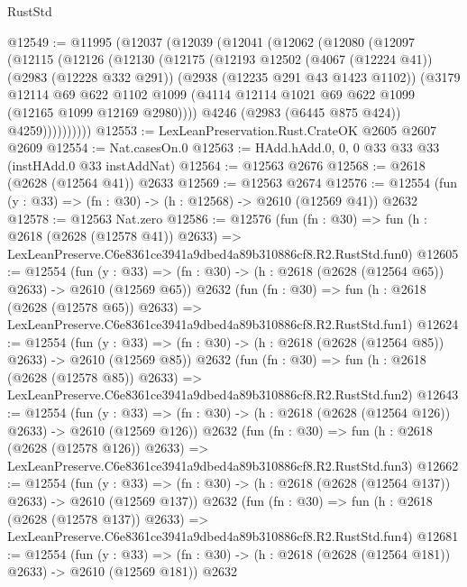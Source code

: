 \begin{lexlean}{RustStd}
\begin{coremodule}
@12549 := @11995
    (@12037
      (@12039
        (@12041
          (@12062
            (@12080
              (@12097
                (@12115
                  (@12126
                    (@12130
                      (@12175
                        (@12193
                          @12502
                          (@4067 (@12224 @41))
                          (@2983 (@12228 @332 @291))
                          (@2938 (@12235 @291 @43 @1423 @1102))
                          (@3179
                            @12114
                            @69
                            @622
                            @1102
                            @1099
                            (@4114 @12114 @1021 @69 @622 @1099 (@12165 @1099 @12169 @2980))))
                        @4246
                        (@2983 (@6445 @875 @424))
                        @4259))))))))))
@12553 := LexLeanPreservation.Rust.CrateOK @2605 @2607 @2609
@12554 := Nat.casesOn.{0}
@12563 := HAdd.hAdd.{0, 0, 0} @33 @33 @33 (instHAdd.{0} @33 instAddNat)
@12564 := @12563 @2676
@12568 := @2618 (@2628 (@12564 @41)) @2633
@12569 := @12563 @2674
@12576 := @12554 (fun (y : @33) => (fn : @30) -> (h : @12568) -> @2610 (@12569 @41)) @2632
@12578 := @12563 Nat.zero
@12586 := @12576
    (fun (fn : @30) =>
    fun (h : @2618 (@2628 (@12578 @41)) @2633) =>
    LexLeanPreserve.C6e8361ce3941a9dbed4a89b310886cf8.R2.RustStd.fun0)
@12605 := @12554
    (fun (y : @33) => (fn : @30) -> (h : @2618 (@2628 (@12564 @65)) @2633) -> @2610 (@12569 @65))
    @2632
    (fun (fn : @30) =>
    fun (h : @2618 (@2628 (@12578 @65)) @2633) =>
    LexLeanPreserve.C6e8361ce3941a9dbed4a89b310886cf8.R2.RustStd.fun1)
@12624 := @12554
    (fun (y : @33) => (fn : @30) -> (h : @2618 (@2628 (@12564 @85)) @2633) -> @2610 (@12569 @85))
    @2632
    (fun (fn : @30) =>
    fun (h : @2618 (@2628 (@12578 @85)) @2633) =>
    LexLeanPreserve.C6e8361ce3941a9dbed4a89b310886cf8.R2.RustStd.fun2)
@12643 := @12554
    (fun (y : @33) => (fn : @30) -> (h : @2618 (@2628 (@12564 @126)) @2633) -> @2610 (@12569 @126))
    @2632
    (fun (fn : @30) =>
    fun (h : @2618 (@2628 (@12578 @126)) @2633) =>
    LexLeanPreserve.C6e8361ce3941a9dbed4a89b310886cf8.R2.RustStd.fun3)
@12662 := @12554
    (fun (y : @33) => (fn : @30) -> (h : @2618 (@2628 (@12564 @137)) @2633) -> @2610 (@12569 @137))
    @2632
    (fun (fn : @30) =>
    fun (h : @2618 (@2628 (@12578 @137)) @2633) =>
    LexLeanPreserve.C6e8361ce3941a9dbed4a89b310886cf8.R2.RustStd.fun4)
@12681 := @12554
    (fun (y : @33) => (fn : @30) -> (h : @2618 (@2628 (@12564 @181)) @2633) -> @2610 (@12569 @181))
    @2632

\end{coremodule}
\end{lexlean}
